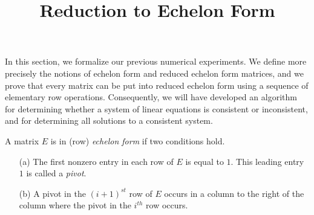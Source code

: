 \documentclass{ximera}
\title{Reduction to Echelon Form}
\begin{document}
\begin{abstract}
\end{abstract}
\maketitle


\label{S:2.4}

In this section, we formalize our previous numerical
experiments.  We define more precisely the notions of echelon
form and reduced echelon form matrices, and we prove that every
matrix can be put into reduced echelon form using a sequence of
elementary row operations.  Consequently, we will have developed
an algorithm for determining whether a system of linear
equations is consistent or inconsistent, and for determining all
solutions to a consistent system.

\begin{Def}
A matrix $E$ is in (row) {\em echelon form\/}  if two conditions hold.
\begin{enumerate}
\item[(a)] The first nonzero entry in each row of $E$ is equal
to $1$.  This leading entry $1$ is called a {\em pivot\/}. 
\item[(b)] A pivot in the $(i+1)^{st}$ row of $E$ occurs in a column to
the right of the column where the pivot in the $i^{th}$ row occurs.
\end{enumerate}
\end{Def}
\end{document}
